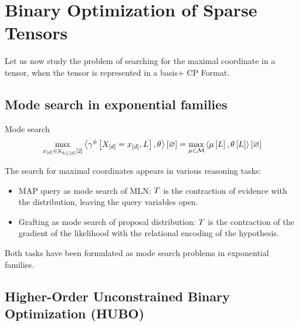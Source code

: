 \section{Binary Optimization of Sparse Tensors}

Let us now study the problem of searching for the maximal coordinate in a tensor, when the tensor is represented in a basis+ CP Format. 




\subsection{Mode search in exponential families}

Mode search 
\begin{align*}
	\max_{x_{[d]}\in\bigtimes_{k\in[d]}[2]} \left\langle \gamma^{\phi}\left[X_{[d]}=x_{[d]},L\right],\theta\right\rangle \left[ \varnothing \right] 
	= \max_{\mu\in\mathcal{M}} \left\langle \mu\left[L\right],\theta\left[L\right]\right\rangle \left[ \varnothing \right]
\end{align*}


The search for maximal coordinates appears in various reasoning tasks:
\begin{itemize}
	\item MAP query as mode search of MLN: $T$ is the contraction of evidence with the distribution, leaving the query variables open.
	\item Grafting as mode search of proposal distribution: $T$ is the contraction of the gradient of the likelihood with the relational encoding of the hypothesis.
\end{itemize}
Both tasks have been formulated as mode search problems in exponential families.



\subsection{Higher-Order Unconstrained Binary Optimization (HUBO)}



